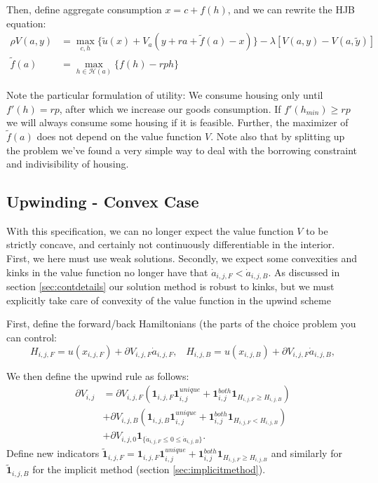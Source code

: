\documentclass[12pt]{article}
\DeclareMathOperator{\1}{\mathbbm{1}}
\begin{document}
Then, define aggregate consumption $x=c+f(h)$, and we can rewrite the HJB equation:
\begin{align*}
\rho V(a,y) &= \max_{c,h} \big \{ \tilde u (x) + V_a (y + ra + \tilde f(a) - x)  \big \} - \lambda [V(a,y) - V(a,\tilde y)] \\
\tilde f (a) &= \max_{h\in \mathcal{H}(a)} \big \{ f(h) - rph \}
\end{align*}

Note the particular formulation of utility: We consume housing only until $f'(h)=rp$, after which we increase our goods consumption. If $f'(h_{min})\ge rp$ we will always consume some housing if it is feasible. Further, the maximizer of $\tilde f(a)$ does not depend on the value function $V$. Note also that by splitting up the problem we've found a very simple way to deal with the borrowing constraint and indivisibility of housing.

\subsection{Upwinding - Convex Case}
With this specification, we can no longer expect the value function $V$ to be strictly concave, and certainly not continuously differentiable in the interior. First, we here must use weak solutions. Secondly, we expect some convexities and kinks in the value function no longer have that $\dot a_{i,j,F}<\dot a_{i,j,B}$.  As discussed in section \ref{sec:contdetails} our solution method is robust to kinks, but we must explicitly take care of convexity of the value function in the upwind scheme

First, define the forward/back Hamiltonians (the parts of the choice problem you can control:
\begin{equation}
H_{i,j,F}=u(x_{i,j,F}) + \partial V_{i,j,F} \dot a_{i,j,F}, \;\;\; H_{i,j,B}=u(x_{i,j,B}) + \partial V_{i,j,F} \dot a_{i,j,B},
\end{equation}

We then define the upwind rule as follows:
\begin{equation}
\begin{split}
\partial V_{i,j} & =  
\partial V_{i,j,F}\left(\mathbf{1}_{i,j,F} \mathbf{1}^{unique}_{i,j} + \mathbf{1}_{i,j}^{both}\mathbf{1}_{H_{i,j,F}\ge H_{i,j,B}}\right)  \\ 
 &+ \partial V_{i,j,B}\left(\mathbf{1}_{i,j,B} \mathbf{1}^{unique}_{i,j} + \mathbf{1}_{i,j}^{both}\mathbf{1}_{H_{i,j,F}<H_{i,j,B}}\right) \\
 &+ \partial V_{i,j,0} \mathbf{1}_{\{\dot a_{i,j,F}\le 0 \le \dot a_{i,j,B}\}}.
\end{split}
\end{equation}
Define new indicators $\tilde {\mathbf{1}}_{i,j,F} =\mathbf{1}_{i,j,F} \mathbf{1}^{unique}_{i,j} + \mathbf{1}_{i,j}^{both}\mathbf{1}_{H_{i,j,F}\ge H_{i,j,B}} $ and similarly for $\tilde {\mathbf{1}}_{i,j,B}$ for the implicit method (section \ref{sec:implicitmethod}).
\end{document}
